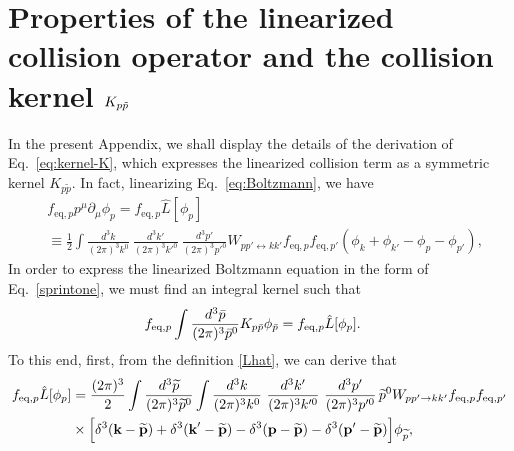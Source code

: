 \documentclass[aps,prd,preprint,nofootinbib,amsmath,amssymb,showpacs,longbibliography,singlecolumn,superscriptaddress,10pt]{revtex4-1}
\theoremstyle{plain}
\theoremstyle{definition}
\begin{document}
\section{Properties of the linearized collision operator and the collision kernel $K_{p\Tilde{p}}$}
\label{eq:K-kernel}

In the present Appendix, we shall display the details of the derivation of Eq.~\eqref{eq:kernel-K}, which expresses the linearized collision term as a symmetric kernel $K_{p \widetilde{p}}$. In fact, linearizing Eq.~\eqref{eq:Boltzmann}, we have
%
\begin{equation}
\label{Lhat}
\begin{aligned}
&
f_{\mathrm{eq},p}
p^{\mu}\partial_{\mu}\phi_p
=
f_{\mathrm{eq},p}
\hat{L}[\phi_{p}] \\
&
\equiv
\frac{1}{2}\int \frac{d^{3}k}{(2 \pi)^{3} k^{0}} \ \frac{d^{3}k'}{(2 \pi)^{3} k'^{0}} \ \frac{d^{3}p'}{(2 \pi)^{3} p'^{0}}  W_{pp' \leftrightarrow kk'} f_{\mathrm{eq},p} f_{\mathrm{eq},p'} (  \phi_{k} + \phi_{k'} - \phi_{p} - \phi_{p'}  ),
\end{aligned}    
\end{equation}
%
In order to express the linearized Boltzmann equation in the form of Eq.~\eqref{sprintone}, we must find an integral kernel such that 
%
\begin{equation}
\label{eq:fund-K-prop}
\begin{aligned}
&
f_{\text{eq},p} \int \dfrac{d^3 \Bar{p}}{(2\pi)^3 \Bar{p}^0} K_{p\Bar{p}} \phi_{\Bar{p}}
=
f_{\text{eq},p}
\Hat{L}[\phi_{p}].
\end{aligned}    
\end{equation}
%
To this end, first, from the definition \eqref{Lhat}, we can derive that
%
\begin{equation}
\label{eq:apn-K-1}
\begin{aligned}
f_{\mathrm{eq},p}
\Hat{L}[\phi_{p}] 
&= \frac{(2\pi)^3}{2} \int\frac{d^3\widetilde{p}}{(2\pi)^3 \widetilde{p}^0} \int \frac{d^3k}{(2\pi)^3 k^0}  \ \frac{d^{3}k'}{(2 \pi)^{3} k'^{0}} \ \frac{d^{3}p'}{(2 \pi)^{3} p'^{0}} \, \widetilde{p}^0   W_{pp' \rightarrow kk'} f_{\mathrm{eq},p} f_{\mathrm{eq},p'} 
\\
&
\times
\Big[ \delta^{3}(\textbf{k}-\widetilde{\textbf{p}}) + \delta^{3}(\textbf{k}'-\widetilde{\textbf{p}}) 
- \delta^{3}(\textbf{p}-\widetilde{\textbf{p}}) - \delta^{3}(\textbf{p}'-\widetilde{\textbf{p}}) \Big] \phi_{\widetilde{p}},
\end{aligned}
\end{equation}
\end{document}
